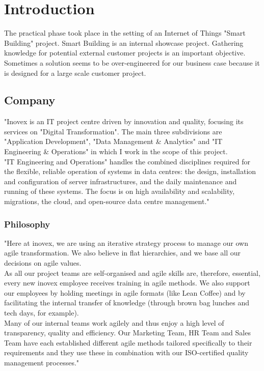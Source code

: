 \section{Introduction}
The practical phase took place in the setting of an Internet of Things "Smart Building" project. Smart Building is an internal showcase project. Gathering knowledge for potential external customer projects is an important objective. Sometimes a solution seems to be over-engineered for our business case because it is designed for a large scale customer project.

\subsection{Company}
"Inovex is an IT project centre driven by innovation and quality, focusing its services on "Digital Transformation". The main three subdivisions are "Application Development", "Data Management \& Analytics" and "IT Engineering \& Operations" in which I work in the scope of this project.\\
"IT Engineering and Operations" handles the combined disciplines required for the flexible, reliable operation of systems in data centres: the design, installation and configuration of server infrastructures, and the daily maintenance and running of these systems. The focus is on high availability and scalability, migrations, the cloud, and open-source data centre management."\cite{inovex}

\subsubsection{Philosophy}
"Here at inovex, we are using an iterative strategy process to manage our own agile transformation. We also believe in flat hierarchies, and we base all our decisions on agile values.\\
As all our project teams are self-organised and agile skills are, therefore, essential, every new inovex employee receives training in agile methods. We also support our employees by holding meetings in agile formats (like Lean Coffee) and by facilitating the internal transfer of knowledge (through brown bag lunches and tech days, for example).\\
Many of our internal teams work agilely and thus enjoy a high level of transparency, quality and efficiency. Our Marketing Team, HR Team and Sales Team have each established different agile methods tailored specifically to their requirements and they use these in combination with our ISO-certified quality management processes."\cite{inovex}
\newpage

